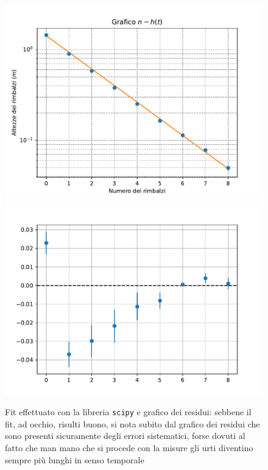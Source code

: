 \documentclass{article}
\begin{document}
\begin{figure}
	\centering
	\includegraphics[scale=0.5]{Grafico_n-h(t).pdf} 
	\includegraphics[scale=0.5]{Grafico_residui.pdf}
	\caption{Fit effettuato con la libreria \texttt{scipy} e grafico dei residui: sebbene il fit, ad occhio, risulti buono, si nota subito dal grafico dei residui che sono presenti sicuramente degli errori sistematici, forse dovuti al fatto che man mano che si procede con la misure gli urti diventino sempre più lunghi in senso temporale}
	\vspace{0.5cm}
\end{figure}
\end{document}
